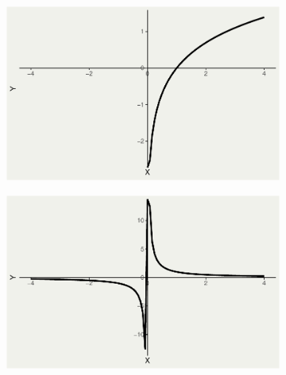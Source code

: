 \documentclass[
  letterpaper,
  DIV=11,
  numbers=noendperiod]{scrartcl}
\begin{document}
\begin{figure}
\begin{minipage}{0.33\linewidth}
\begin{figure}[H]

{\centering \includegraphics{index_files/figure-pdf/unnamed-chunk-5-4.pdf}

}


\end{figure}%

\end{minipage}%
%
\begin{minipage}{0.33\linewidth}

\begin{figure}[H]

{\centering \includegraphics{index_files/figure-pdf/unnamed-chunk-5-5.pdf}

}


\end{figure}%


\end{minipage}
\end{figure}
\end{document}
